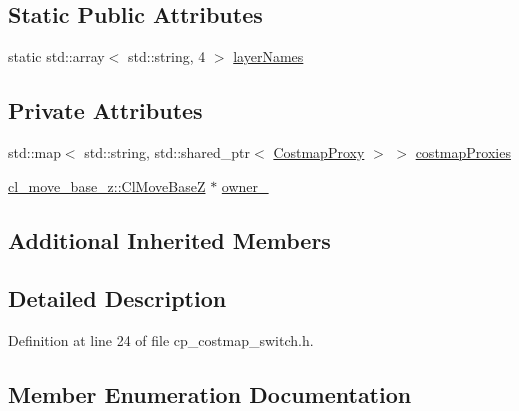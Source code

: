 \subsection*{Static Public Attributes}
\begin{DoxyCompactItemize}
\item 
static std\+::array$<$ std\+::string, 4 $>$ \hyperlink{classcl__move__base__z_1_1CostmapSwitch_aee0c75c8f4459cacaf583ef8c90ff329}{layer\+Names}
\end{DoxyCompactItemize}
\subsection*{Private Attributes}
\begin{DoxyCompactItemize}
\item 
std\+::map$<$ std\+::string, std\+::shared\+\_\+ptr$<$ \hyperlink{classcl__move__base__z_1_1CostmapProxy}{Costmap\+Proxy} $>$ $>$ \hyperlink{classcl__move__base__z_1_1CostmapSwitch_a3a574ac1f7f3eff19cdf7ad0e15297e4}{costmap\+Proxies}
\item 
\hyperlink{classcl__move__base__z_1_1ClMoveBaseZ}{cl\+\_\+move\+\_\+base\+\_\+z\+::\+Cl\+Move\+BaseZ} $\ast$ \hyperlink{classcl__move__base__z_1_1CostmapSwitch_a42a7da3f7301daa691ef1593ae926618}{owner\+\_\+}
\end{DoxyCompactItemize}
\subsection*{Additional Inherited Members}


\subsection{Detailed Description}


Definition at line 24 of file cp\+\_\+costmap\+\_\+switch.\+h.



\subsection{Member Enumeration Documentation}
